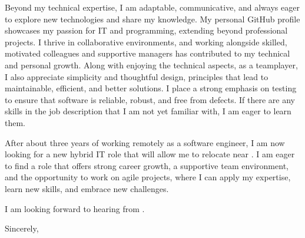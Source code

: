 \documentclass[10pt, a4paper]{article}
\begin{document}
Beyond my technical expertise, I am adaptable, communicative, and always eager to explore new technologies and share my knowledge. My personal GitHub profile showcases my passion for IT and programming, extending beyond professional projects. I thrive in collaborative environments, and working alongside skilled, motivated colleagues and supportive managers has contributed to my technical and personal growth. Along with enjoying the technical aspects, as a teamplayer, I also appreciate simplicity and thoughtful design, principles that lead to maintainable, efficient, and better solutions. I place a strong emphasis on testing to ensure that software is reliable, robust, and free from defects. If there are any skills in the job description that I am not yet familiar with, I am eager to learn them.

After about three years of working remotely as a software engineer, I am now looking for a new hybrid IT role that will allow me to relocate near \CITY. I am eager to find a role that offers strong career growth, a supportive team environment, and the opportunity to work on agile projects, where I can apply my expertise, learn new skills, and embrace new challenges.

I am looking forward to hearing from \COMPANY. 

\bigskip

Sincerely,

\vspace{20pt}

\firstName\ \lastName
\end{document}

